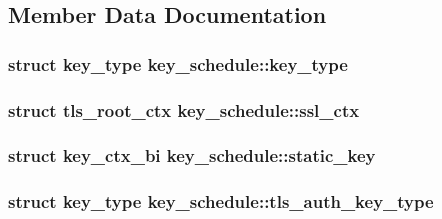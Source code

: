 \subsection{Member Data Documentation}
\hypertarget{structkey__schedule_a4a34faf7867d3d6647238e914324a99b}{}
\subsubsection[{key\+\_\+type}]{\setlength{\rightskip}{0pt plus 5cm}struct {\bf key\+\_\+type} key\+\_\+schedule\+::key\+\_\+type}\label{structkey__schedule_a4a34faf7867d3d6647238e914324a99b}
\hypertarget{structkey__schedule_a5e59f0aab5d757ed334039b15682829a}{}
\subsubsection[{ssl\+\_\+ctx}]{\setlength{\rightskip}{0pt plus 5cm}struct {\bf tls\+\_\+root\+\_\+ctx} key\+\_\+schedule\+::ssl\+\_\+ctx}\label{structkey__schedule_a5e59f0aab5d757ed334039b15682829a}
\hypertarget{structkey__schedule_aea2d2038fbffa038ea608eaf923bb2db}{}
\subsubsection[{static\+\_\+key}]{\setlength{\rightskip}{0pt plus 5cm}struct {\bf key\+\_\+ctx\+\_\+bi} key\+\_\+schedule\+::static\+\_\+key}\label{structkey__schedule_aea2d2038fbffa038ea608eaf923bb2db}
\hypertarget{structkey__schedule_a6a3add124db00336ab5c081037ae11fd}{}
\subsubsection[{tls\+\_\+auth\+\_\+key\+\_\+type}]{\setlength{\rightskip}{0pt plus 5cm}struct {\bf key\+\_\+type} key\+\_\+schedule\+::tls\+\_\+auth\+\_\+key\+\_\+type}\label{structkey__schedule_a6a3add124db00336ab5c081037ae11fd}
\hypertarget{structkey__schedule_ad2ce1d97a35d1c487ce7c13f52d900c5}{}
